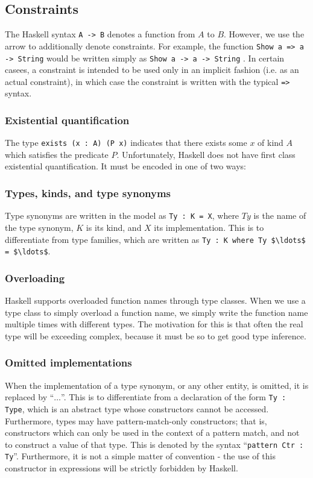 \subsection{Constraints}
The Haskell syntax \texttt{A -> B} denotes a function from $A$ to $B$. However,
we use the arrow to additionally denote constraints. For example, the function
\texttt{Show a => a -> String} would be written simply as \lstinline!Show a -> a -> String!
.
In certain casees, a constraint is intended to be used only in an implicit 
fashion 
(i.e. as an actual constraint), in which case the constraint is written with 
the typical \lstinline{=>} syntax. 

\subsubsection{Existential quantification}
The type \lstinline!exists (x : A) (P x)! indicates that there exists some $x$
of kind $A$ which satisfies the predicate $P$. Unfortunately, Haskell does not
have first class existential quantification. It must be encoded in one of
two ways:

\subsubsection{Types, kinds, and type synonyms}
Type synonyms are written in the model as \lstinline!Ty : K = X!, where $Ty$ is 
the name
of the type synonym, $K$ is its kind, and $X$ its implementation. This is to 
differentiate
from type families, which are written as 
\lstinline!Ty : K where Ty $\ldots$ = $\ldots$!.

\subsubsection{Overloading}
Haskell supports overloaded function names through type classes. When we use a 
type 
class to simply overload a function name, we simply write the function name
multiple times with different types. The motivation for this is that often the 
real type will be exceeding complex, because it must be so to get good type 
inference. 



\subsubsection{Omitted implementations}
When the implementation of a type synonym, or any other entity, is omitted, it
is replaced by ``$\ldots$''. This is to differentiate from a declaration of the 
form
\lstinline!Ty : Type!, which is an abstract type whose constructors cannot be
accessed. Furthermore, types may have pattern-match-only constructors; that is,
constructors which can only be used in the context of a pattern match, and not
to construct a value of that type. This is denoted by the syntax
``\lstinline!pattern Ctr : Ty!''. Furthermore, it is not a simple matter of
convention - the use of this constructor in expressions will be strictly
forbidden by Haskell.


